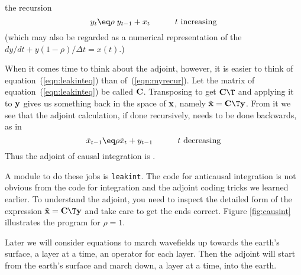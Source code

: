 the recursion
\begin{equation}
y_t \eq \rho\; y_{t-1} + x_t
\quad
\quad
\quad t\ {\rm increasing}
\label{eqn:myrecur}
\end{equation}
(which may also be regarded as a numerical representation
of the  $dy/dt+y (1-\rho)/\Delta t=x(t)$.)
\par
When it comes time to think about the adjoint, however,
it is easier to think of equation~(\ref{eqn:leakinteq}) than of~(\ref{eqn:myrecur}).
Let the matrix of equation~(\ref{eqn:leakinteq}) be called $\bold C$.
Transposing to get $\bold{C}\T$ and applying it to $\bold y$
gives us something back in the space of $\bold x$,
namely $\tilde{\bold x} = \bold C\T \bold y$.
From it we see that the adjoint calculation,
if done recursively,
needs to be done backwards, as in
\begin{equation}
\tilde x_{t-1} \eq \rho \tilde x_{t} + y_{t-1}
\quad
\quad
\quad t \ {\rm decreasing}
\label{eqn:backrecur}
\end{equation}
Thus the adjoint of causal integration
is .
\par
A module to do these jobs is \texttt{leakint}.
The code for anticausal integration is not obvious
from the code for integration and the adjoint coding tricks we
learned earlier.
To understand the adjoint, you need to inspect
the detailed form of the expression $\tilde{\bold x} = \bold C\T \bold y$
and take care to get the ends correct.
Figure \ref{fig:causint} illustrates the program for $\rho = 1$.
\par
\par
Later we will consider equations
to march wavefields up towards the earth's surface,
a layer at a time, an operator for each layer.
Then the adjoint will start from the earth's surface
and march down, a layer at a time, into the earth.


